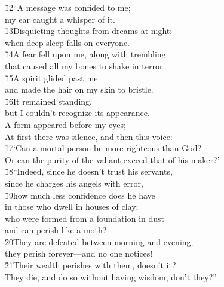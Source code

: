 \begin{poetry}
\poeml \v{12}``A message was confided to me; \\
\poemll    my ear caught a whisper of it. \\
\poeml \v{13}Disquieting thoughts from dreams at night; \\
\poemll    when deep sleep falls on everyone. \\
\poeml \v{14}A fear fell upon me, along with trembling \\
\poemll    that caused all my bones to shake in terror. \\
\poeml \v{15}A spirit glided past me \\
\poemll    and made the hair on my skin to bristle. \\
\poeml \v{16}It remained standing, \\
\poemll    but I couldn't recognize its appearance. \\
\poeml A form appeared before my eyes; \\
\poemll    At first there was silence, and then this voice: \\
\poeml \v{17}`Can a mortal person be more righteous than God? \\
\poemll    Or can the purity of the valiant exceed that of his maker?' \\
\poeml \v{18}``Indeed, since he doesn't trust his servants, \\
\poemll    since he charges his angels with error, \\
\poeml \v{19}how much less confidence does he have \\
\poemll    in those who dwell in houses of clay; \\
\poeml who were formed from a foundation in dust \\
\poemll    and can perish like a moth? \\
\poeml \v{20}They are defeated between morning and evening; \\
\poemll    they perish forever---and no one notices! \\
\poeml \v{21}Their wealth perishes with them, doesn't it? \\
\poemll    They die, and do so without having wisdom, don't they?''
\end{poetry}

